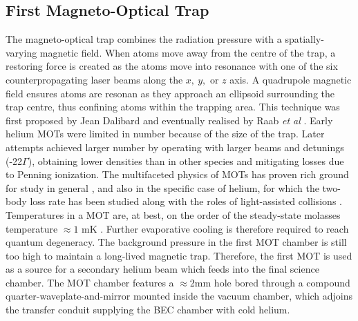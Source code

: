 
\subsection*{First Magneto-Optical Trap}

	The magneto-optical trap combines the radiation pressure with a spatially-varying magnetic field.
	When atoms move away from the centre of the trap, a restoring force is created as the atoms move into resonance with one of the six counterpropagating laser beams along the $x,~y,$ or $z$ axis.
	A quadrupole magnetic field ensures atoms are resonan as they approach an ellipsoid surrounding the trap centre, thus confining atoms within the trapping area.
	This technique was first proposed by Jean Dalibard and eventually realised by Raab \emph{et al} \cite{raab87}.
	Early helium MOTs were limited in number because of the size of the trap.
	Later attempts achieved larger number by operating with larger beams and detunings (-22$\Gamma$), obtaining lower densities than in other species \cite{tol99} and mitigating losses due to Penning ionization.
	The multifaceted physics of MOTs has proven rich ground for study in general \cite{Townsend95,walker90}, and also in the specific case of helium, for which the two-body loss rate has been studied \cite{tol99} along with the roles of light-assisted collisions \cite{papers}.
	Temperatures in a MOT are, at best, on the order of the steady-state molasses temperature $\approx1$ mK \cite{Lett81}.
	Further evaporative cooling is therefore required to reach quantum degeneracy.
	The background pressure in the first MOT chamber is still too high to maintain a long-lived magnetic trap.
	Therefore, the first MOT is used as a source for a secondary helium beam which feeds into the final science chamber.
	The MOT chamber features a $\approx$2mm hole bored through a compound quarter-waveplate-and-mirror mounted inside the vacuum chamber, which adjoins the transfer conduit supplying the BEC chamber with cold helium.

